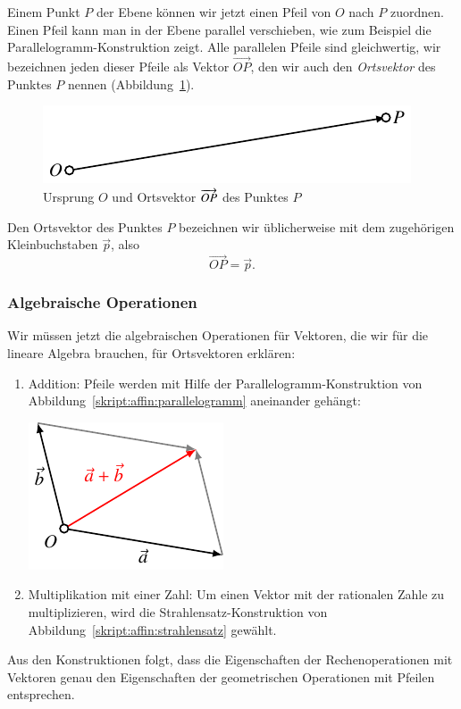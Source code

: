 Einem Punkt $P$ der Ebene können wir jetzt einen Pfeil
von $O$ nach $P$ zuordnen.
Einen Pfeil kann man in der Ebene parallel verschieben,
wie zum Beispiel die Parallelogramm-Konstruktion zeigt.
Alle parallelen Pfeile sind gleichwertig, wir bezeichnen
jeden dieser Pfeile als Vektor $\overrightarrow{OP}$, den
wir auch den {\em Ortsvektor} des Punktes $P$ nennen
(Abbildung~\ref{skript:affin:ortsvektor}).
\begin{figure}
\centering
\includegraphics{3/images/vektor.pdf}
\caption{
Ursprung $O$ und Ortsvektor $\protect\overrightarrow{OP}$ des Punktes $P$
\label{skript:affin:ortsvektor}
}
\end{figure}

\begin{konvention}
Den Ortsvektor des Punktes $P$ bezeichnen wir üblicherweise mit dem 
zugehörigen Kleinbuchstaben $\vec{p}$, also
\[
\overrightarrow{OP} = \vec{p}.
\]
\end{konvention}

\subsubsection{Algebraische Operationen}
Wir müssen jetzt die algebraischen Operationen für Vektoren,
die wir für die lineare Algebra brauchen, für Ortsvektoren erklären:
\begin{enumerate}
\item
Addition: Pfeile werden mit Hilfe der Parallelogramm-Konstruktion
von Abbildung~\ref{skript:affin:parallelogramm}
aneinander gehängt:
\begin{center}
\includegraphics{3/images/addition.pdf}
\end{center}
\item
Multiplikation mit einer Zahl: Um einen Vektor mit der rationalen
Zahle zu multiplizieren, wird die Strahlensatz-Konstruktion
von Abbildung~\ref{skript:affin:strahlensatz} gewählt.
\end{enumerate}
Aus den Konstruktionen folgt, dass die Eigenschaften der Rechenoperationen
mit Vektoren genau den Eigenschaften der geometrischen Operationen
mit Pfeilen entsprechen.

